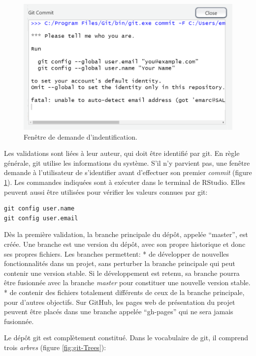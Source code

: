 \documentclass[
  11pt,
  french,
  a4paper,
  extrafontsizes,onecolumn,openright
  ]{memoir}
\begin{document}
\scriptsize

\begin{figure}

{\centering \includegraphics[width=0.8\linewidth]{images/git-id} 

}

\caption{Fenêtre de demande d'indentification.}\label{fig:git-id}
\end{figure}

\normalsize

Les validations sont liées à leur auteur, qui doit être identifié par git.
En règle générale, git utilise les informations du système.
S'il n'y parvient pas, une fenêtre demande à l'utilisateur de s'identifier avant d'effectuer son premier \emph{commit} (figure \ref{fig:git-id}).
Les commandes indiquées sont à exécuter dans le terminal de RStudio.
Elles peuvent aussi être utilisées pour vérifier les valeurs connues par git:

\begin{verbatim}
git config user.name
git config user.email
\end{verbatim}

Dès la première validation, la branche principale du dépôt, appelée ``master'', est créée.
Une branche est une version du dépôt, avec son propre historique et donc ses propres fichiers.
Les branches permettent:
* de développer de nouvelles fonctionnalités dans un projet, sans perturber la branche principale qui peut contenir une version stable. Si le développement est retenu, sa branche pourra être fusionnée avec la branche \emph{master} pour constituer une nouvelle version stable.
* de contenir des fichiers totalement différents de ceux de la branche principale, pour d'autres objectifs. Sur GitHub, les pages web de présentation du projet peuvent être placés dans une branche appelée ``gh-pages'' qui ne sera jamais fusionnée.

Le dépôt git est complètement constitué.
Dans le vocabulaire de git, il comprend trois \emph{arbres} (figure \ref{fig:git-Trees}):
\end{document}

